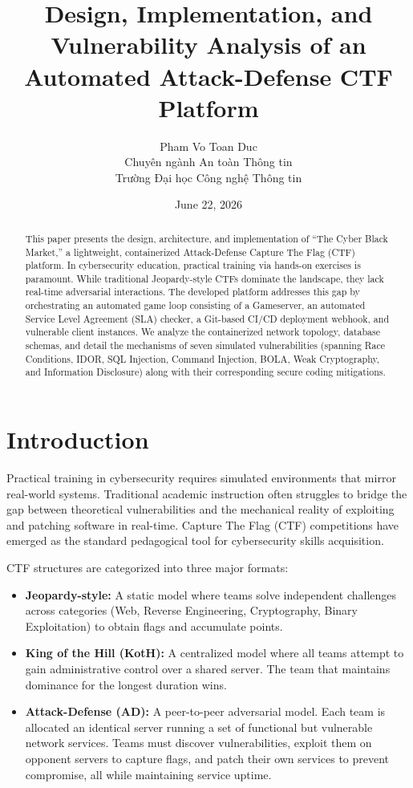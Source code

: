 \documentclass[10pt,journal,compsoc]{article}
\title{\textbf{Design, Implementation, and Vulnerability Analysis of an Automated Attack-Defense CTF Platform}}
\author{Pham Vo Toan Duc \\ \small Chuyên ngành An toàn Thông tin \\ \small Trường Đại học Công nghệ Thông tin}
\date{June 22, 2026}
\begin{document}
\maketitle

\begin{abstract}
This paper presents the design, architecture, and implementation of ``The Cyber Black Market,'' a lightweight, containerized Attack-Defense Capture The Flag (CTF) platform. In cybersecurity education, practical training via hands-on exercises is paramount. While traditional Jeopardy-style CTFs dominate the landscape, they lack real-time adversarial interactions. The developed platform addresses this gap by orchestrating an automated game loop consisting of a Gameserver, an automated Service Level Agreement (SLA) checker, a Git-based CI/CD deployment webhook, and vulnerable client instances. We analyze the containerized network topology, database schemas, and detail the mechanisms of seven simulated vulnerabilities (spanning Race Conditions, IDOR, SQL Injection, Command Injection, BOLA, Weak Cryptography, and Information Disclosure) along with their corresponding secure coding mitigations.
\end{abstract}

\section{Introduction}
Practical training in cybersecurity requires simulated environments that mirror real-world systems. Traditional academic instruction often struggles to bridge the gap between theoretical vulnerabilities and the mechanical reality of exploiting and patching software in real-time. Capture The Flag (CTF) competitions have emerged as the standard pedagogical tool for cybersecurity skills acquisition.

CTF structures are categorized into three major formats:
\begin{itemize}
    \item \textbf{Jeopardy-style:} A static model where teams solve independent challenges across categories (Web, Reverse Engineering, Cryptography, Binary Exploitation) to obtain flags and accumulate points.
    \item \textbf{King of the Hill (KotH):} A centralized model where all teams attempt to gain administrative control over a shared server. The team that maintains dominance for the longest duration wins.
    \item \textbf{Attack-Defense (AD):} A peer-to-peer adversarial model. Each team is allocated an identical server running a set of functional but vulnerable network services. Teams must discover vulnerabilities, exploit them on opponent servers to capture flags, and patch their own services to prevent compromise, all while maintaining service uptime.
\end{itemize}
\end{document}
